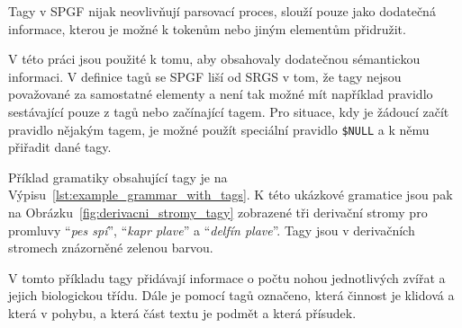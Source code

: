 Tagy v SPGF nijak neovlivňují parsovací proces, slouží pouze jako dodatečná informace,
kterou je možné k tokenům nebo jiným elementům přidružit.

V této práci jsou použité k tomu, aby obsahovaly dodatečnou sémantickou informaci.
V definice tagů se SPGF liší od SRGS v tom, že tagy nejsou považované za samostatné elementy a není tak možné mít například
pravidlo sestávající pouze z tagů nebo začínající tagem.
Pro situace, kdy je žádoucí začít pravidlo nějakým tagem,
je možné použít speciální pravidlo \texttt{\$NULL} a k němu přiřadit dané tagy.

Příklad gramatiky obsahující tagy je na Výpisu~\ref{lst:example_grammar_with_tags}.
K této ukázkové gramatice jsou pak na Obrázku~\ref{fig:derivacni_stromy_tagy} zobrazené tři derivační stromy pro promluvy
\enquote{\emph{pes spí}},
\enquote{\emph{kapr plave}}
a
\enquote{\emph{delfín plave}}.
Tagy jsou v derivačních stromech znázorněné zelenou barvou.

V tomto příkladu tagy přidávají informace o počtu nohou jednotlivých zvířat a jejich biologickou třídu.
Dále je pomocí tagů označeno, která činnost je klidová a která v pohybu, a která část textu je podmět a která přísudek.

